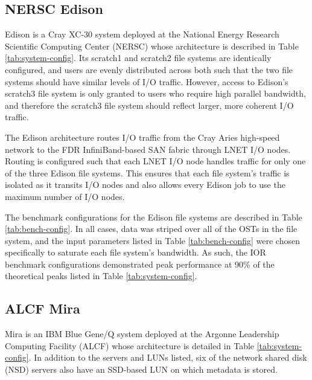 \subsection{NERSC Edison} \label{sec:platforms/edison}

Edison is a Cray XC-30 system deployed at the National Energy Research Scientific Computing Center (NERSC) whose architecture is described in Table \ref{tab:system-config}.
Its scratch1 and scratch2 file systems are identically configured, and users are evenly distributed across both such that the two file systems should have similar levels of I/O traffic.
However, access to Edison's scratch3 file system is only granted to users who require high parallel bandwidth, and therefore the scratch3 file system should reflect larger, more coherent I/O traffic.

The Edison architecture routes I/O traffic from the Cray Aries high-speed network to the FDR InfiniBand-based SAN fabric through LNET I/O nodes.
Routing is configured such that each LNET I/O node handles traffic for only one of the three Edison file systems.
This ensures that each file system's traffic is isolated as it transits I/O nodes and also allows every Edison job to use the maximum number of I/O nodes.

The benchmark configurations for the Edison file systems are described in Table \ref{tab:bench-config}.
In all cases, data was striped over all of the OSTs in the file system, and the input parameters listed in Table \ref{tab:bench-config} were chosen specifically to saturate each file system's bandwidth.
As such, the IOR benchmark configurations demonstrated peak performance at 90\% of the theoretical peaks listed in Table \ref{tab:system-config}.

\subsection{ALCF Mira} \label{sec:platforms/mira}

Mira is an IBM Blue Gene/Q system deployed at the Argonne Leadership Computing Facility (ALCF) whose architecture is detailed in Table \ref{tab:system-config}.
In addition to the servers and LUNs listed, six of the network shared disk (NSD) servers also have an SSD-based LUN on which metadata is stored.

